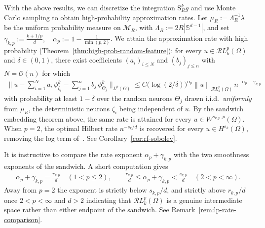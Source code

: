 \documentclass[12pt]{article}
\numberwithin{equation}{section}
\numberwithin{figure}{section}
\numberwithin{equation}{section}
\newcommand{\Sph}{\mathbb S}
\newcommand{\MR}{\mathcal M_R}
\newcommand{\norm}[1]{\left\|#1\right\|}
\newcommand{\abs}[1]{\left|#1\right|}
\begin{document}
With the above results, we can discretize the integration $\mathrm{S}^k_R g$ and use Monte Carlo sampling to obtain high-probability approximation rates.
Let $\mu_R:=\Lambda_R^{-1}\lambda$ be
the uniform probability measure on $\MR$, with $\Lambda_R:=2R\abs{\Sph^{d-1}}$, and
set $\gamma_{k,p}:=\frac{k+1/p}{d}, \quad \alpha_p:=1-\frac1{\min(p,2)}$.
We attain the approximation rate with high probability
(Theorem~\ref{thm:high-prob-random-feature}): 
for every $u\in\mathcal{R}L^p_k(\Omega)$ and $\delta\in(0,1)$, there exist
coefficients $(a_i)_{i\le N}$ and $(b_j)_{j\le n}$ with $N=\mathcal O(n)$ for which
\begin{align*}
    \Big\|u-\sum_{i=1}^N a_i\,\phi^k_{\zeta_i}-\sum_{j=1}^n b_j\,\phi^k_{\Theta_j}
    \Big\|_{L^p(\Omega)}
    \le
    C\bigl(\log(2/\delta)\bigr)^{\alpha_p}
    \norm{u}_{\mathcal{R}L^p_k(\Omega)}\,
    n^{-\alpha_p-\gamma_{k,p}}
\end{align*}
with probability at least $1-\delta$ over the random neurons $\Theta_j$
drawn i.i.d.\ \emph{uniformly} from $\mu_R$, the
deterministic neurons $\zeta_i$ being independent of $u$.
By the sandwich embedding theorem above, the same rate is attained for
every $u\in W^{s_{k,p},p}(\Omega)$. When $p=2$, the optimal Hilbert rate
$n^{-s_k/d}$ is recovered for every $u \in H^{s_k}(\Omega)$, removing
the log term of~\cite[Theorem 6.2]{liu_integralrepresentationssobolev_2025}. 
See Corollary~\ref{cor:rf-sobolev}.

It is instructive to compare the rate exponent $\alpha_p+\gamma_{k,p}$ with the
two smoothness exponents of the sandwich. A short computation gives
\begin{align*}
    \alpha_p+\gamma_{k,p}=\frac{r_{k,p}}{d}\quad(1<p\le2),
    \qquad
    \frac{r_{k,p}}{d}\le\alpha_p+\gamma_{k,p}<\frac{s_{k,p}}{d}\quad(2<p<\infty).
\end{align*}
Away from $p=2$ the exponent is strictly below $s_{k,p}/d$, and strictly above
$r_{k,p}/d$ once $2<p<\infty$ and $d>2$ indicating that $\mathcal{R}L^p_k(\Omega)$ 
is a genuine intermediate space rather than either endpoint of the sandwich.
See Remark~\ref{rem:lp-rate-comparison}.
\end{document}
